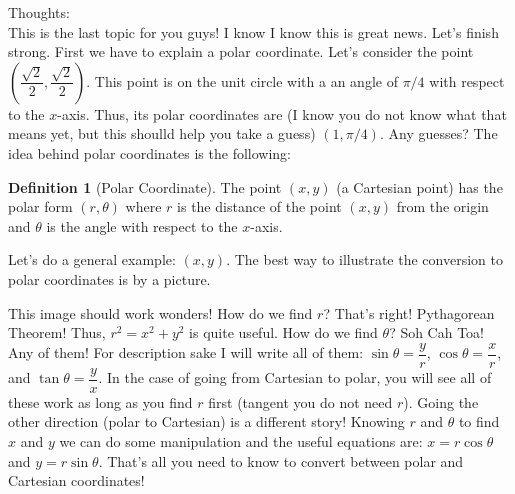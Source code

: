 \documentclass[10pt]{article}
\theoremstyle{Theorem}
\theoremstyle{definition}
\newtheorem{definition}{Definition}[section]
\theoremstyle{remark}
\theoremstyle{custom}
\begin{document}
\thispagestyle{firststyle}
\pagestyle{plain}


\noindent Thoughts: \\
This is the last topic for you guys! I know I know this is great news. Let's finish strong.  First we have to explain a polar coordinate. Let's consider the point $\left( \dfrac{\sqrt{2}}{2},\dfrac{\sqrt{2}}{2}\right)$. This point is on the unit circle with a an angle of $\pi/4$ with respect to the $x$-axis. Thus, its polar coordinates are (I know you do not know what that means yet, but this shoulld help you take a guess) $(1, \pi/4)$.  Any guesses? The idea behind polar coordinates is the following:
\begin{definition}[Polar Coordinate]
The point $(x,y)$ (a Cartesian point) has the polar form $(r,\theta)$ where $r$ is the distance of the point $(x,y)$ from the origin and $\theta$ is the angle with respect to the $x$-axis. 
\end{definition}
Let's do a general example: $(x,y)$.  The best way to illustrate the conversion to polar coordinates is by a picture.
\begin{center}
\end{center}
This image should work wonders! How do we find $r$? That's right! Pythagorean Theorem! Thus, $r^2=x^2+y^2$ is quite useful. How do we find $\theta$? Soh Cah Toa! Any of them! For description sake I will write all of them: $\sin\theta=\dfrac{y}{r}$, $\cos\theta=\dfrac{x}{r}$, and $\tan\theta = \dfrac{y}{x}$. In the case of going from Cartesian to polar, you will see all of these work as long as you find $r$ first (tangent you do not need $r$). Going the other direction (polar to Cartesian) is a different story! Knowing $r$ and $\theta$ to find $x$ and $y$ we can do some manipulation and the useful equations are: $x=r\cos\theta$ and $y=r\sin\theta$. That's all you need to know to convert between polar and Cartesian coordinates!\\
\end{document}
